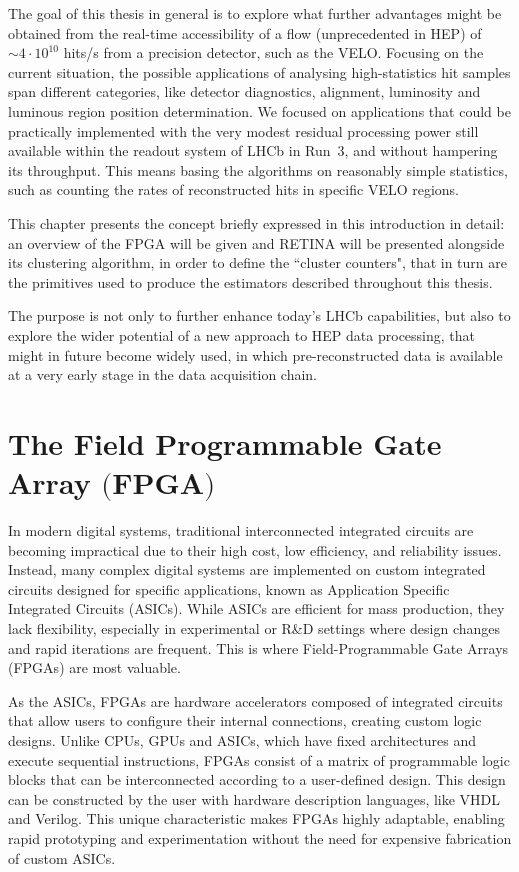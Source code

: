 The goal of this thesis in general is to explore what further advantages might be obtained from the real-time accessibility of a flow (unprecedented in HEP) of $\sim4\cdot 10^{10}$ hits/s from a precision detector, such as the VELO. Focusing on the current situation, the possible applications of analysing high-statistics hit samples span different categories, like detector diagnostics, alignment, luminosity and luminous region position determination. 
We focused on applications that could be practically implemented with the very modest residual processing power still available within the readout system of LHCb in Run~3, and without hampering its throughput. This means basing the algorithms on reasonably simple statistics, such as counting the rates of reconstructed hits in specific VELO regions.

This chapter presents the concept briefly expressed in this introduction in detail: an overview of the FPGA will be given and RETINA will be presented alongside its clustering algorithm, in order to define the ``cluster counters", that in turn are the primitives used to produce the estimators described throughout this thesis.

The purpose is not only to further enhance today's LHCb capabilities, but also to explore the wider potential of a new approach to HEP data processing, that might in future become widely used, in which pre-reconstructed data is available at a very early stage in the data acquisition chain.




\section[The Field Programmable Gate Array]{The Field Programmable Gate Array $\bigl($FPGA$\bigr)$}\label{sec:FPGA}

In modern digital systems, traditional interconnected integrated circuits are becoming impractical due to their high cost, low efficiency, and reliability issues. Instead, many complex digital systems are implemented on custom integrated circuits designed for specific applications, known as Application Specific Integrated Circuits (ASICs). While ASICs are efficient for mass production, they lack flexibility, especially in experimental or R\&D settings where design changes and rapid iterations are frequent. This is where Field-Programmable Gate Arrays (FPGAs) are most valuable.

As the ASICs, FPGAs are hardware accelerators composed of integrated circuits that allow users to configure their internal connections, creating custom logic designs. Unlike CPUs, GPUs and ASICs, which have fixed architectures and execute sequential instructions, FPGAs consist of a matrix of programmable logic blocks that can be interconnected according to a user-defined design. This design can be constructed by the user with hardware description languages, like VHDL and Verilog. This unique characteristic makes FPGAs highly adaptable, enabling rapid prototyping and experimentation without the need for expensive fabrication of custom ASICs.

